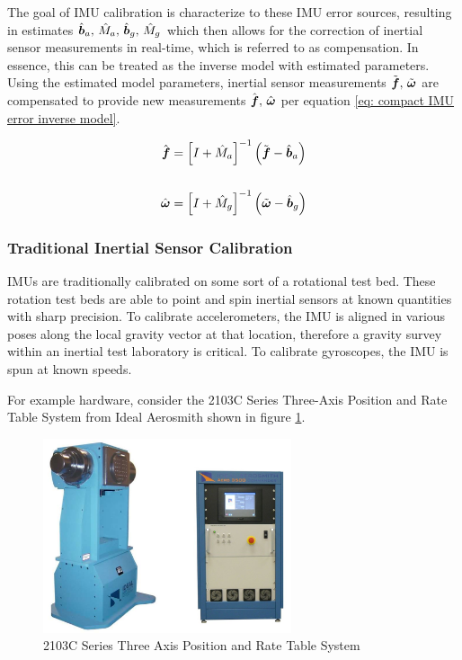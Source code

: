 The goal of IMU calibration is characterize to these IMU error sources, resulting in estimates $\hat{\boldsymbol{b}}_a, \, \hat{M}_a, \, \hat{\boldsymbol{b}}_g, \, \hat{M}_g
$ which then allows for the correction of inertial sensor measurements in real-time, which is referred to as compensation. In essence, this can be treated as the inverse model with estimated parameters. Using the estimated model parameters, inertial sensor measurements $\tilde{\boldsymbol{f}},\,\tilde{\boldsymbol{\omega}}$ are compensated to provide new measurements $\hat{\boldsymbol{f}},\,\hat{\boldsymbol{\omega}}$ per equation \ref{eq: compact IMU error inverse model}.

\begin{align} \label{eq: compact IMU error inverse model}
	\hat{\boldsymbol{f}} &= \left[I + \hat{M}_a\right]^{-1} \left(\tilde{\boldsymbol{f}} - \hat{\boldsymbol{b}}_a\right) \notag\\
	\\
	\hat{\boldsymbol{\omega}} &= \left[I + \hat{M}_g\right]^{-1} \left(\tilde{\boldsymbol{\omega}} - \hat{\boldsymbol{b}}_g\right) \notag
\end{align}


\subsubsection{Traditional Inertial Sensor Calibration}

IMUs are traditionally calibrated on some sort of a rotational test bed. These rotation test beds are able to point and spin inertial sensors at known quantities with sharp precision. To calibrate accelerometers, the IMU is aligned in various poses along the local gravity vector at that location, therefore a gravity survey within an inertial test laboratory is critical. To calibrate gyroscopes, the IMU is spun at known speeds.

For example hardware, consider the 2103C Series Three-Axis Position and Rate Table System from Ideal Aerosmith \cite{threeAxisRateTableTable} shown in figure \ref{fig: three axis rate table example}. 

\begin{figure}[h] 
	\centering
	\includegraphics[width=0.65\textwidth]{./images/three_axis_rate_table_example.png}
	\caption{2103C Series Three Axis Position and Rate Table System}
	\label{fig: three axis rate table example}
\end{figure}
\FloatBarrier

